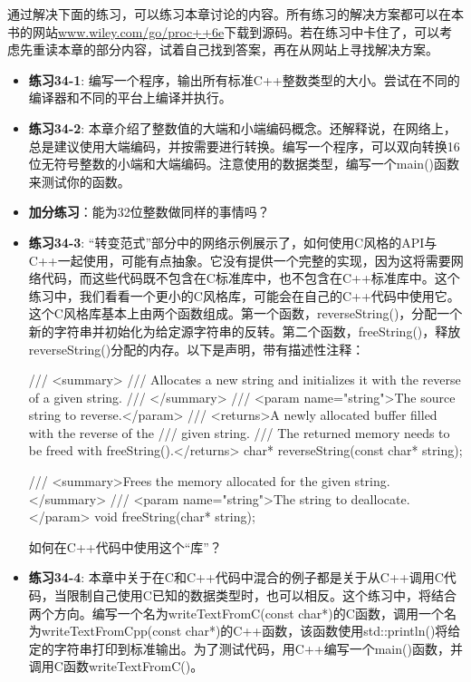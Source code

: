 通过解决下面的练习，可以练习本章讨论的内容。所有练习的解决方案都可以在本书的网站\url{www.wiley.com/go/proc++6e}下载到源码。若在练习中卡住了，可以考虑先重读本章的部分内容，试着自己找到答案，再在从网站上寻找解决方案。

\begin{itemize}
\item
\textbf{练习34-1}: 编写一个程序，输出所有标准C++整数类型的大小。尝试在不同的编译器和不同的平台上编译并执行。

\item
\textbf{练习34-2}: 本章介绍了整数值的大端和小端编码概念。还解释说，在网络上，总是建议使用大端编码，并按需要进行转换。编写一个程序，可以双向转换16位无符号整数的小端和大端编码。注意使用的数据类型，编写一个main()函数来测试你的函数。

\item
\textbf{加分练习}：能为32位整数做同样的事情吗？

\item
\textbf{练习34-3}: “转变范式”部分中的网络示例展示了，如何使用C风格的API与C++一起使用，可能有点抽象。它没有提供一个完整的实现，因为这将需要网络代码，而这些代码既不包含在C标准库中，也不包含在C++标准库中。这个练习中，我们看看一个更小的C风格库，可能会在自己的C++代码中使用它。这个C风格库基本上由两个函数组成。第一个函数，reverseString()，分配一个新的字符串并初始化为给定源字符串的反转。第二个函数，freeString()，释放reverseString()分配的内存。以下是声明，带有描述性注释：

\begin{cpp}
/// <summary>
/// Allocates a new string and initializes it with the reverse of a given string.
/// </summary>
/// <param name="string">The source string to reverse.</param>
/// <returns>A newly allocated buffer filled with the reverse of the
/// given string.
/// The returned memory needs to be freed with freeString().</returns>
char* reverseString(const char* string);

/// <summary>Frees the memory allocated for the given string.</summary>
/// <param name="string">The string to deallocate.</param>
void freeString(char* string);
\end{cpp}

如何在C++代码中使用这个“库”？

\item
\textbf{练习34-4}: 本章中关于在C和C++代码中混合的例子都是关于从C++调用C代码，当限制自己使用C已知的数据类型时，也可以相反。这个练习中，将结合两个方向。编写一个名为writeTextFromC(const char*)的C函数，调用一个名为writeTextFromCpp(const char*)的C++函数，该函数使用std::println()将给定的字符串打印到标准输出。为了测试代码，用C++编写一个main()函数，并调用C函数writeTextFromC()。
\end{itemize}
